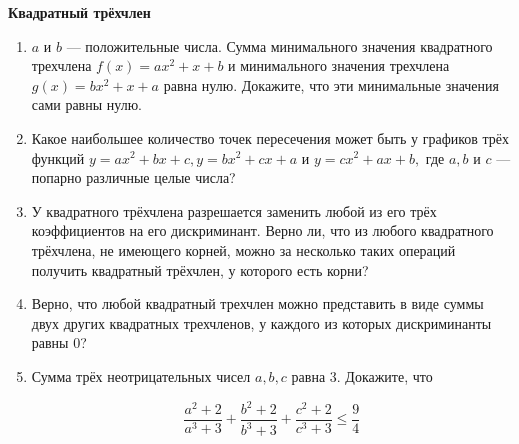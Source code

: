 \documentclass{article}
\begin{document}
    \large

    \begin{center}
        \textbf{Квадратный трёхчлен}
    \end{center}

    \begin{enumerate}[label*=\protect\fbox{\arabic{enumi}}]

        \item $a$ и $b$ — положительные числа.
        Сумма минимального значения квадратного трехчлена $f(x) = ax^2 + x + b$ и минимального значения трехчлена $g(x) = bx^2 + x + a$ равна нулю.
        Докажите, что эти минимальные значения сами равны нулю.

        \item Какое наибольшее количество точек пересечения может быть у графиков трёх функций $y = ax^2 + bx + c, y = bx^2 + cx + a$ и $y = cx^2 + ax + b,$ где $a, b$ и $c$ — попарно различные целые числа?

        \item У квадратного трёхчлена разрешается заменить любой из его трёх коэффициентов на его дискриминант.
        Верно ли, что из любого квадратного трёхчлена, не имеющего корней, можно за несколько таких операций получить квадратный трёхчлен, у которого есть корни?

        \item Верно, что любой квадратный трехчлен можно представить в виде суммы двух других квадратных трехчленов, у каждого из которых дискриминанты равны 0?

        \item Сумма трёх неотрицательных чисел $a, b, c$ равна 3.
        Докажите, что

        \[
            \frac{a^2 + 2}{a^3 + 3} +
            \frac{b^2 + 2}{b^3 + 3}+
            \frac{c^2 + 2}{c^3 + 3} \leqslant \frac{9}{4}
        \]

    \end{enumerate}
\end{document}
